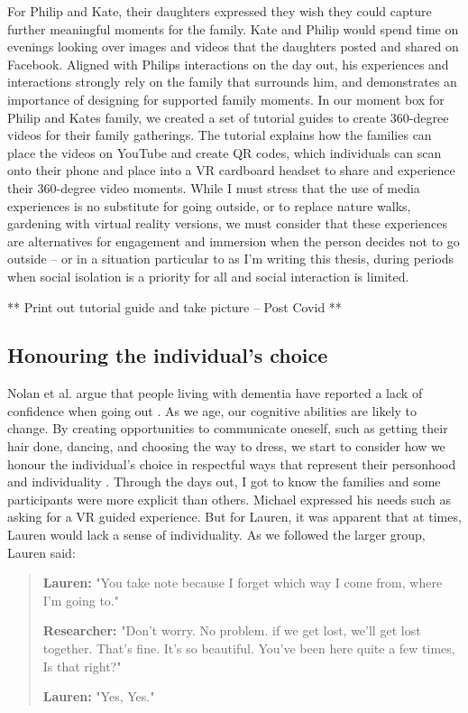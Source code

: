 For Philip and Kate, their daughters expressed they wish they could capture further meaningful moments for the family. Kate and Philip would spend time on evenings looking over images and videos that the daughters posted and shared on Facebook. Aligned with Philips interactions on the day out, his experiences and interactions strongly rely on the family that surrounds him, and demonstrates an importance of designing for supported family moments. In our moment box for Philip and Kates family, we created a set of tutorial guides to create 360-degree videos for their family gatherings. The tutorial explains how the families can place the videos on YouTube and create QR codes, which individuals can scan onto their phone and place into a VR cardboard headset to share and experience their 360-degree video moments. While I must stress that the use of media experiences is no substitute for going outside, or to replace nature walks, gardening with virtual reality versions, we must consider that these experiences are alternatives for engagement and immersion when the person decides not to go outside – or in a situation particular to as I'm writing this thesis, during periods when social isolation is a priority for all and social interaction is limited.

** Print out tutorial guide and take picture – Post Covid **

\subsection{Honouring the individual's choice}
\label{momentBoxes:IndividualChoice}
Nolan et al. argue that people living with dementia have reported a lack of confidence when going out \citep{nolan_perceptions_2006}. As we age, our cognitive abilities are likely to change. By creating opportunities to communicate oneself, such as getting their hair done, dancing, and choosing the way to dress, we start to consider how we honour the individual's choice in respectful ways that represent their personhood and individuality \citep{twigg_dress_2013}. Through the days out, I got to know the families and some participants were more explicit than others. Michael expressed his needs such as asking for a VR guided experience. But for Lauren, it was apparent that at times, Lauren would lack a sense of individuality. As we followed the larger group, Lauren said: 

\begin{quote}
    
\textbf{Lauren:} "You take note because I forget which way I come from, where I'm going to."

\textbf{Researcher:} "Don't worry. No problem. if we get lost, we'll get lost together. That's fine. It's so beautiful. You've been here quite a few times, Is that right?"

\textbf{Lauren:} "Yes, Yes."
\end{quote}


